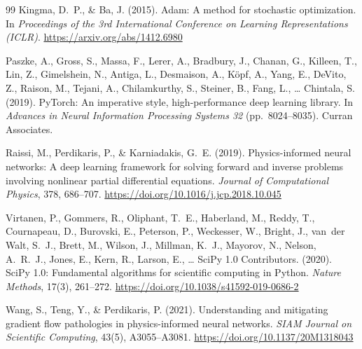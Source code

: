 \documentclass[12pt,a4paper]{article}
\begin{document}
\begin{thebibliography}{99}
Kingma, D.~P., \& Ba, J. (2015).
Adam: A method for stochastic optimization.
In \textit{Proceedings of the 3rd International Conference on Learning Representations (ICLR)}.
\url{https://arxiv.org/abs/1412.6980}

Paszke, A., Gross, S., Massa, F., Lerer, A., Bradbury, J., Chanan, G., Killeen, T., Lin, Z., Gimelshein, N., Antiga, L., Desmaison, A., K{\"o}pf, A., Yang, E., DeVito, Z., Raison, M., Tejani, A., Chilamkurthy, S., Steiner, B., Fang, L., \ldots{} Chintala, S. (2019).
PyTorch: An imperative style, high-performance deep learning library.
In \textit{Advances in Neural Information Processing Systems 32} (pp.\ 8024--8035). Curran Associates.

Raissi, M., Perdikaris, P., \& Karniadakis, G.~E. (2019).
Physics-informed neural networks: A deep learning framework for solving forward and inverse problems involving nonlinear partial differential equations.
\textit{Journal of Computational Physics}, 378, 686--707.
\url{https://doi.org/10.1016/j.jcp.2018.10.045}

Virtanen, P., Gommers, R., Oliphant, T.~E., Haberland, M., Reddy, T., Cournapeau, D., Burovski, E., Peterson, P., Weckesser, W., Bright, J., van~der Walt, S.~J., Brett, M., Wilson, J., Millman, K.~J., Mayorov, N., Nelson, A.~R.~J., Jones, E., Kern, R., Larson, E., \ldots{} SciPy 1.0 Contributors. (2020).
SciPy 1.0: Fundamental algorithms for scientific computing in Python.
\textit{Nature Methods}, 17(3), 261--272.
\url{https://doi.org/10.1038/s41592-019-0686-2}

Wang, S., Teng, Y., \& Perdikaris, P. (2021).
Understanding and mitigating gradient flow pathologies in physics-informed neural networks.
\textit{SIAM Journal on Scientific Computing}, 43(5), A3055--A3081.
\url{https://doi.org/10.1137/20M1318043}

\end{thebibliography}
\end{document}
